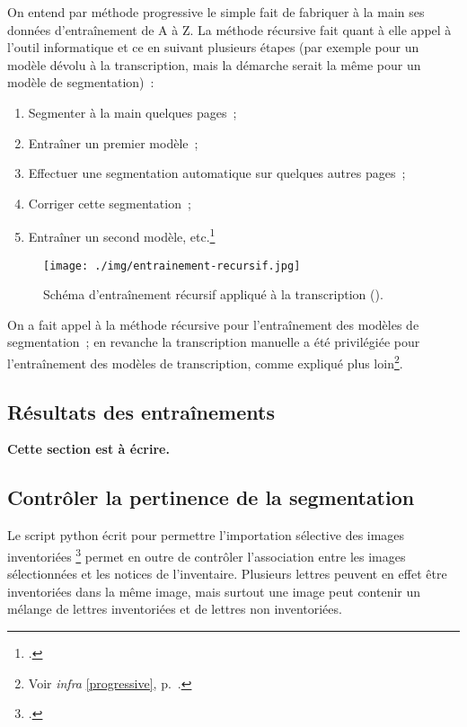 \documentclass[a4paper,12pt,twoside]{book}
\begin{document}
	    		On entend par méthode progressive le simple fait de fabriquer à la main ses données d'entraînement de A à Z. La méthode récursive fait quant à elle appel à l'outil informatique et ce en suivant plusieurs étapes (par exemple pour un modèle dévolu à la transcription, mais la démarche serait la même pour un modèle de \gls{segmentation})~:
	    		
	    		\begin{enumerate}
	    			\item Segmenter à la main quelques pages~;
	    			\item Entraîner un premier modèle~;
	    			\item Effectuer une \gls{segmentation} automatique sur quelques autres pages~;
	    			\item Corriger cette \gls{segmentation}~;
	    			\item Entraîner un second modèle, etc.\footcite{stokesEScriptoriumVREManuscript2021}
	    		\end{enumerate}
    			
    			\begin{figure}[!h]
    				\centering
    				\texttt{[image: ./img/entrainement-recursif.jpg]}
    				\caption{Schéma d'entraînement récursif appliqué à la transcription (\cite{pincheHTRPresentationProblematiques2021}).}
    				\label{fig}
    			\end{figure}
    			
    			On a fait appel à la méthode récursive pour l'entraînement des modèles de \gls{segmentation}~; en revanche la transcription manuelle a été privilégiée pour l'entraînement des modèles de transcription, comme expliqué plus loin\footnote{Voir \textit{infra} \ref{progressive}, p.~\pageref{progressive}.}.
    		
    		\subsection{Résultats des entraînements}
    			\textbf{Cette section est à écrire.}
	    		
	    	\subsection{Contrôler la pertinence de la \gls{segmentation}}
		    	\label{controle-segmentation-lettres-inventoriees}
	    		
	    		Le script python écrit pour permettre l'importation sélective des images inventoriées \footcite{biayDonneesImagesPy2022} permet en outre de contrôler l'association entre les images sélectionnées et les notices de l'inventaire. Plusieurs lettres peuvent en effet être inventoriées dans la même image, mais surtout une image peut contenir un mélange de lettres inventoriées et de lettres non inventoriées.
	    		
\end{document}
